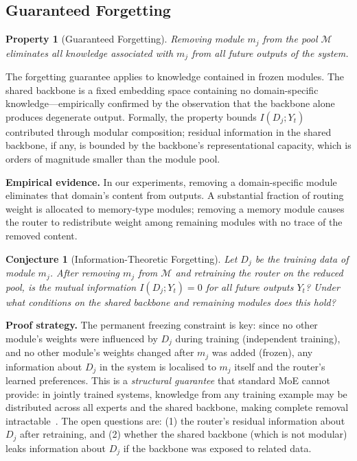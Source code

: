 \documentclass[11pt,a4paper]{article}
\newtheorem{property}{Property}
\newtheorem{conjecture}{Conjecture}
\begin{document}
\subsection{Guaranteed Forgetting}
\label{sec:forgetting}

\begin{property}[Guaranteed Forgetting]
Removing module $m_j$ from the pool $\mathcal{M}$ eliminates all knowledge associated with $m_j$ from all future outputs of the system.
\end{property}

\noindent The forgetting guarantee applies to knowledge contained in frozen modules. The shared backbone is a fixed embedding space containing no domain-specific knowledge---empirically confirmed by the observation that the backbone alone produces degenerate output. Formally, the property bounds $I(D_j; Y_t)$ contributed through modular composition; residual information in the shared backbone, if any, is bounded by the backbone's representational capacity, which is orders of magnitude smaller than the module pool.

\noindent\textbf{Empirical evidence.} In our experiments, removing a domain-specific module eliminates that domain's content from outputs. A substantial fraction of routing weight is allocated to memory-type modules; removing a memory module causes the router to redistribute weight among remaining modules with no trace of the removed content.

\begin{conjecture}[Information-Theoretic Forgetting]
Let $D_j$ be the training data of module $m_j$. After removing $m_j$ from $\mathcal{M}$ and retraining the router on the reduced pool, is the mutual information $I(D_j; Y_t) = 0$ for all future outputs $Y_t$? Under what conditions on the shared backbone and remaining modules does this hold?
\end{conjecture}

\noindent\textbf{Proof strategy.} The permanent freezing constraint is key: since no other module's weights were influenced by $D_j$ during training (independent training), and no other module's weights changed after $m_j$ was added (frozen), any information about $D_j$ in the system is localised to $m_j$ itself and the router's learned preferences. This is a \emph{structural guarantee} that standard MoE cannot provide: in jointly trained systems, knowledge from any training example may be distributed across all experts and the shared backbone, making complete removal intractable~\cite{bourtoule2021machine}. The open questions are: (1) the router's residual information about $D_j$ after retraining, and (2) whether the shared backbone (which is not modular) leaks information about $D_j$ if the backbone was exposed to related data.
\end{document}
